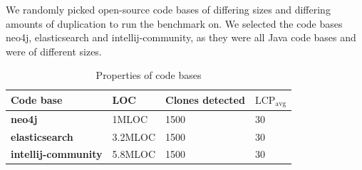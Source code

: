 We randomly picked open-source code bases of differing sizes and differing amounts of
duplication to run the benchmark on. We selected the code bases neo4j, elasticsearch and
intellij-community, as they were all Java code bases and were of different sizes.

\begin{table}
    \caption{Properties of code bases}
    \label{tab:}
    \begin{center}
        \begin{tabular}[c]{l|l|l|l}
            Code base & LOC & Clones detected & $\text{LCP}_{\text{avg}}$ \\
            \hline
            \textbf{neo4j} & 1MLOC & 1500 & 30 \\
            \hline
            \textbf{elasticsearch} & 3.2MLOC & 1500 & 30 \\
            \hline
            \textbf{intellij-community} & 5.8MLOC & 1500 & 30 \\
            \hline
        \end{tabular}
    \end{center}
\end{table}



